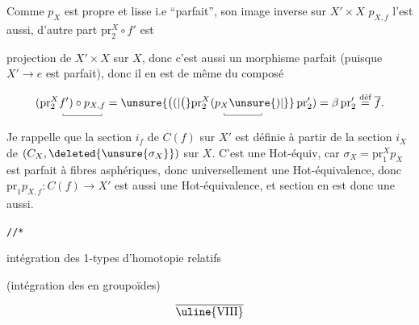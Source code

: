 
Comme $p_X$ est propre et lisse i.e ``parfait'', son image inverse sur $X'\times X$  $p_{X,f}$ l'est aussi, d'autre part $\mathrm{pr}_2^X\circ f'$ est 

projection  de $X'\times X$ sur $X$, donc c'est aussi un morphisme parfait (puisque $X'\longrightarrow e$ est parfait), donc il en est de même du composé

\[
(\mathrm{pr}_2^X\underset{\raisebox{0pt}{\rule{.35pt}{.5ex}\rule{3.4em}{.35pt}\rule{.35pt}{.5ex}}}{f')\circ p_{X,f}}
=\unsure{\bigl((|\bigl(}\underset{\raisebox{0pt}{\rule{.35pt}{.5ex}\rule{3.3em}{.35pt}\rule{.35pt}{.5ex}}}{\mathrm{pr}_2^X(p_X\unsure{)|\}}}\,\mathrm{pr}_2')
=\beta\,\mathrm{pr}_2'\overset{\text{déf}}{=}\overline f.
\]

Je rappelle que  la section $i_f$ de $C(f)$ sur $X'$ est définie à partir de la section $i_X$ de $(C_X,\deleted{\unsure{\sigma_X}})$ sur $X$. C'est une Hot-équiv, car $\sigma_X=\mathrm{pr}_1^X p_X$ est parfait à fibres asphériques, donc universellement une Hot-équivalence, donc $\mathrm{pr}_1 p_{X,f}\colon C(f)\longrightarrow X'$ est aussi une Hot-équivalence, et  section en est donc une aussi.

\texttt{//*\quad {}\quad {}\quad {}}

intégration des 1-types d'homotopie relatifs

(intégration des  en groupoïdes)

\[
\overline{\uline{\mathrm{VIII}}}
\]

